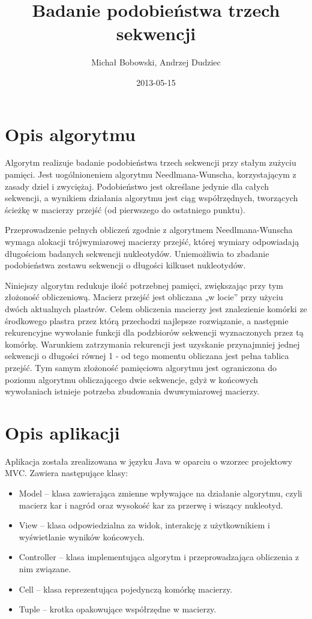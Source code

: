 \documentclass[a4paper,12pt,oneside,notitlepage,onecolumn]{article}
\author{Michał Bobowski, Andrzej Dudziec}
\date{2013-05-15}
\title{Badanie podobieństwa trzech sekwencji}
\begin{document}
  \maketitle

\section{Opis algorytmu}

Algorytm realizuje badanie podobieństwa trzech sekwencji przy stałym zużyciu pamięci.
Jest uogólnioneniem algorytmu Needlmana-Wunscha, korzystającym z zasady dziel i zwyciężaj.
Podobieństwo jest określane jedynie dla całych sekwencji, a wynikiem działania algorytmu jest ciąg współrzędnych, tworzących ścieżkę w macierzy przejść (od pierwszego do ostatniego punktu).

Przeprowadzenie pełnych obliczeń zgodnie z algorytmem Needlmana-Wunscha wymaga alokacji trójwymiarowej macierzy przejść, której wymiary odpowiadają długościom badanych sekwencji nukleotydów. 
Uniemożliwia to zbadanie podobieństwa zestawu sekwencji o długości kilkuset nukleotydów.

Niniejszy algorytm redukuje ilość potrzebnej pamięci, zwiększając przy tym złożoność obliczeniową. 
Macierz przejść jest obliczana „w locie” przy użyciu dwóch aktualnych plastrów. 
Celem obliczenia macierzy jest znalezienie komórki ze środkowego plastra przez którą przechodzi najlepsze rozwiązanie, a następnie rekurencyjne wywołanie funkcji dla podzbiorów sekwencji wyznaczonych przez tą komórkę.
Warunkiem zatrzymania rekurencji jest uzyskanie przynajmniej jednej sekwencji o długości równej 1 - od tego momentu obliczana jest pełna tablica przejść.
Tym samym złożoność pamięciowa algorytmu jest ograniczona do poziomu algorytmu obliczającego dwie sekwencje, gdyż w końcowych wywołaniach istnieje potrzeba zbudowania dwuwymiarowej macierzy.

\section{Opis aplikacji}
Aplikacja została zrealizowana w języku Java w oparciu o wzorzec projektowy MVC. Zawiera następujące klasy:
\begin{itemize}
 \item Model – klasa zawierająca zmienne wpływające na działanie algorytmu, czyli macierz kar i nagród oraz wysokość kar za przerwę i wiszący nukleotyd.
 \item View – klasa odpowiedzialna za widok, interakcję z użytkownikiem i wyświetlanie wyników końcowych.
 \item Controller – klasa implementująca algorytm i przeprowadzająca obliczenia z nim związane.
 \item Cell – klasa reprezentująca pojedynczą komórkę macierzy.
 \item Tuple – krotka opakowujące współrzędne w macierzy.
\end{itemize}
\end{document}

